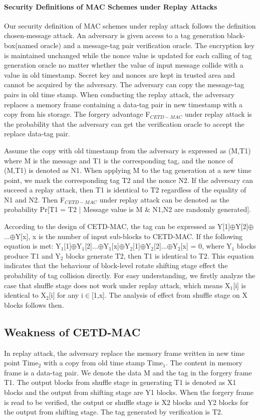 \documentclass{article}
\begin{document}
\paragraph{Security Definitions of MAC Schemes under Replay Attacks}
Our security definition of MAC schemes under replay attack follows the definition chosen-message attack. 
An adversary is given access to a tag generation black-box(named oracle) and a message-tag pair verification oracle. The encryption key is maintained unchanged while the nonce value is updated for each calling of tag generation oracle no matter whether the value of input message collide with a value in old timestamp. Secret key and nonces are kept in trusted area and cannot be acquired by the adversary. The adversary can copy the message-tag pairs in old time stamp. When conducting the replay attack, the adversary replaces a memory frame containing a data-tag pair in new timestamp with a copy from his storage. The forgery advantage F$_{CETD-MAC}$ under replay attack is the probability that the adversary can get the verification oracle to accept the replace data-tag pair.  

Assume the copy with old timestamp from the adversary is expressed as (M,T1) where M is the message and T1 is the corresponding tag, and the nonce of (M,T1) is denoted as N1. When applying M to the tag generation at a new time point, we mark the corresponding tag T2 and the nonce N2. If the adversary can succeed a replay attack, then T1 is identical to T2 regardless of the equality of N1 and N2.
Then F$_{CETD-MAC}$ under replay attack can be denoted as the probability Pr[T1 = T2 $\mid$ Message value is M \& N1,N2 are randomly generated]. 

According to the design of CETD-MAC, the tag can be expressed as Y[1]$\oplus$Y[2]$\oplus$$\ldots$$\oplus$Y[x], x is the number of input sub-blocks to CETD-MAC. If the following equation is met:
Y$_1$[1]$\oplus$Y$_1$[2]$\ldots$$\oplus$Y$_1$[x]$\oplus$Y$_2$[1]$\oplus$Y$_2$[2]$\ldots$$\oplus$Y$_2$[x] = 0, where Y$_1$ blocks produce T1 and Y$_2$ blocks generate T2, then T1 is identical to T2. This equation indicates that the behaviour of block-level rotate shifting stage effect the probability of tag collision directly. For easy understanding, we firstly analyze the case that shuffle stage does not work under replay attack, which means X$_1$[i] is identical to X$_2$[i] for any i$\in$[1,x]. The analysis of effect from shuffle stage on X blocks follows then.

\subsection{Weakness of CETD-MAC}
In replay attack, the adversary replace the memory frame written in new time point Time$_2$ with a copy from old time stamp Time$_1$. The content in memory frame is a data-tag pair. We denote the data M and the tag in the forgery frame T1. The output blocks from shuffle stage in generating T1 is denoted as X1 blocks and the output from shifting stage are Y1 blocks. When the forgery frame is read to be verified, the output or shuffle stage is X2 blocks and Y2 blocks for the output from shifting stage. The tag generated by verification is T2.  
\end{document}
